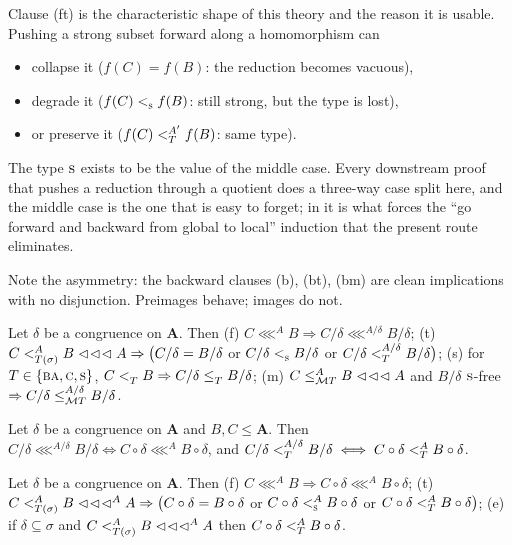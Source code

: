 \begin{hazard}\label{haz:ft}
Clause (ft) is the characteristic shape of this theory and the reason it is
usable. Pushing a strong subset forward along a homomorphism can
\begin{itemize}\tightlist
\item collapse it ($f(C)=f(B)$: the reduction becomes vacuous),
\item degrade it ($f(C)\subt{\TS}f(B)$: still strong, but the type is lost),
\item or preserve it ($f(C)\subt[A']{T}f(B)$: same type).
\end{itemize}
The type $\TS$ exists to be the value of the middle case. Every downstream
proof that pushes a reduction through a quotient does a three-way case split
here, and the middle case is the one that is easy to forget; in \cite{ZhukJACM}
it is what forces the ``go forward and backward from global to local''
induction that the present route eliminates.

Note the asymmetry: the backward clauses (b), (bt), (bm) are clean
implications with no disjunction. Preimages behave; images do not.
\end{hazard}

\begin{corollary}\label{cor:prop-quotient}
Let $\delta$ be a congruence on $\mathbf A$. Then
\textup{(f)} $C\lll^{A}B\Rightarrow C/\delta\lll^{A/\delta}B/\delta$;
\textup{(t)} $C\subt[A]{T(\sigma)}B\lll A\Rightarrow
 \bigl(C/\delta=B/\delta$ or $C/\delta\subt{\TS}B/\delta$ or
 $C/\delta\subt[A/\delta]{T}B/\delta\bigr)$;
\textup{(s)} for $T\in\{\TBA,\TC,\TS\}$, $C\subt{T}B\Rightarrow
 C/\delta\subte{T}B/\delta$;
\textup{(m)} $C\subte[A]{\MT T}B\lll A$ and $B/\delta$ $\TS$-free
 $\Rightarrow C/\delta\subte[A/\delta]{\MT T}B/\delta$.
\end{corollary}

\begin{corollary}\label{cor:prop-from-factor}
Let $\delta$ be a congruence on $\mathbf A$ and $B,C\le\mathbf A$. Then
$C/\delta\lll^{A/\delta}B/\delta\iff C\circ\delta\lll^{A}B\circ\delta$, and
$C/\delta\subt[A/\delta]{T}B/\delta\iff C\circ\delta\subt[A]{T}B\circ\delta$.
\end{corollary}

\begin{corollary}\label{cor:prop-times-cong}
Let $\delta$ be a congruence on $\mathbf A$. Then
\textup{(f)} $C\lll^{A}B\Rightarrow C\circ\delta\lll^{A}B\circ\delta$;
\textup{(t)} $C\subt[A]{T(\sigma)}B\lll^{A}A\Rightarrow
 \bigl(C\circ\delta=B\circ\delta$ or $C\circ\delta\subt[A]{\TS}B\circ\delta$
 or $C\circ\delta\subt[A]{T}B\circ\delta\bigr)$;
\textup{(e)} if $\delta\subseteq\sigma$ and $C\subt[A]{T(\sigma)}B\lll^{A}A$
 then $C\circ\delta\subt[A]{T}B\circ\delta$.
\end{corollary}

